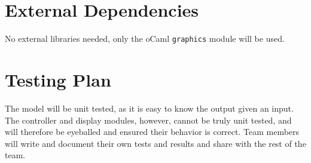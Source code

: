 \documentclass[10pt]{article}
\begin{document}
\clearpage
\part*{External Dependencies}
No external libraries needed, only the oCaml \texttt{graphics} module will be used.

\part*{Testing Plan}
The model will be unit tested, as it is easy to know the output given an input. The controller and display modules, however, cannot be truly unit tested, and will therefore be eyeballed and ensured their behavior is correct. Team members will write and document their own tests and results and share with the rest of the team.
\end{document}
